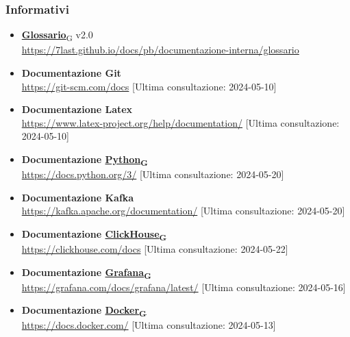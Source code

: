 \subsubsection{Informativi}
\begin{itemize}
    \item\href{https://7last.github.io/docs/pb/documentazione-interna/glossario\#glossario}{\textbf{Glossario}\textsubscript{G}} v2.0\\ \url{https://7last.github.io/docs/pb/documentazione-interna/glossario}
    \item\textbf{Documentazione Git}\\ \url{https://git-scm.com/docs} [Ultima consultazione: 2024-05-10]
    \item\textbf{Documentazione Latex}\\ \url{https://www.latex-project.org/help/documentation/} [Ultima consultazione: 2024-05-10]
    \item\textbf{Documentazione \href{https://7last.github.io/docs/pb/documentazione-interna/glossario\#python}{Python\textsubscript{G}}}\\ \url{https://docs.python.org/3/} [Ultima consultazione: 2024-05-20]
    \item\textbf{Documentazione Kafka}\\ \url{https://kafka.apache.org/documentation/} [Ultima consultazione: 2024-05-20]
    \item\textbf{Documentazione \href{https://7last.github.io/docs/pb/documentazione-interna/glossario\#clickhouse}{ClickHouse\textsubscript{G}}}\\ \url{https://clickhouse.com/docs} [Ultima consultazione: 2024-05-22]
    \item\textbf{Documentazione \href{https://7last.github.io/docs/pb/documentazione-interna/glossario\#grafana}{Grafana\textsubscript{G}}}\\ \url{https://grafana.com/docs/grafana/latest/} [Ultima consultazione: 2024-05-16]
    \item\textbf{Documentazione \href{https://7last.github.io/docs/pb/documentazione-interna/glossario\#docker}{Docker\textsubscript{G}}}\\ \url{https://docs.docker.com/} [Ultima consultazione: 2024-05-13]
\end{itemize}